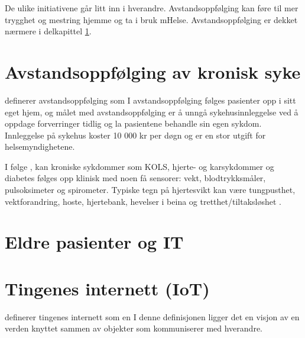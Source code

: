 De ulike initiativene går litt inn i hverandre. Avstandsoppfølging kan føre til mer trygghet og mestring hjemme
og ta i bruk mHelse. Avstandsoppfølging er dekket nærmere i delkapittel \ref{sec:remotemonitoring}.

\section{Avstandsoppfølging av kronisk syke}
\label{sec:remotemonitoring}
\citet{rojahn2016remote} definerer avstandsoppfølging som 
I avstandsoppfølging følges pasienter opp i sitt eget hjem, og
målet med avstandsoppfølging er å unngå sykehusinnleggelse ved å oppdage forverringer tidlig og la
pasientene behandle sin egen sykdom. Innleggelse på sykehus koster 10 000 kr per døgn og er en stor utgift
for helsemyndighetene. %

I følge \citet{austad2016sensorer}, kan kroniske sykdommer som KOLS, hjerte- og karsykdommer og diabetes
følges opp klinisk med noen få sensorer: vekt, blodtrykksmåler, pulsoksimeter og spirometer. Typiske
tegn på hjertesvikt kan være tungpusthet, vektforandring, hoste, hjertebank, hevelser i beina og
tretthet/tiltaksløshet \citep{ehelse_hjertesvikt}. %



\section{Eldre pasienter og IT} 

\section{Tingenes internett (IoT)}
\citet{iot_legal} definerer tingenes internett som en
 I denne definisjonen ligger det en
visjon av en verden knyttet sammen av objekter som kommuniserer med hverandre.

